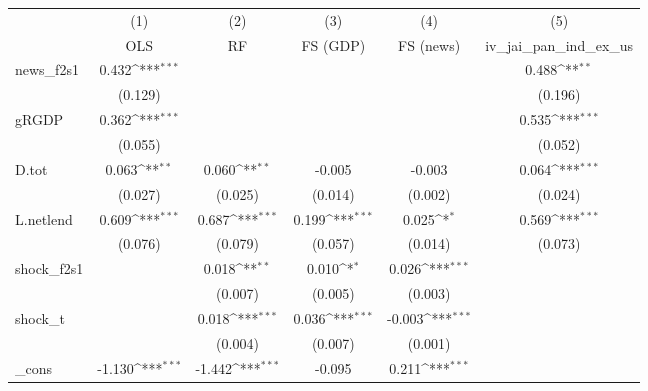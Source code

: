 {
\def\sym#1{\ifmmode^{#1}\else\(^{#1}\)\fi}
\begin{tabular}{l*{5}{c}}
\toprule
            &\multicolumn{1}{c}{(1)}&\multicolumn{1}{c}{(2)}&\multicolumn{1}{c}{(3)}&\multicolumn{1}{c}{(4)}&\multicolumn{1}{c}{(5)}\\
            &\multicolumn{1}{c}{OLS}&\multicolumn{1}{c}{RF}&\multicolumn{1}{c}{FS (GDP)}&\multicolumn{1}{c}{FS (news)}&\multicolumn{1}{c}{iv\_jai\_pan\_ind\_ex\_us}\\
\midrule
news\_f2s1   &       0.432\sym{***}&                     &                     &                     &       0.488\sym{**} \\
            &     (0.129)         &                     &                     &                     &     (0.196)         \\
\addlinespace
gRGDP       &       0.362\sym{***}&                     &                     &                     &       0.535\sym{***}\\
            &     (0.055)         &                     &                     &                     &     (0.052)         \\
\addlinespace
D.tot       &       0.063\sym{**} &       0.060\sym{**} &      -0.005         &      -0.003         &       0.064\sym{***}\\
            &     (0.027)         &     (0.025)         &     (0.014)         &     (0.002)         &     (0.024)         \\
\addlinespace
L.netlend   &       0.609\sym{***}&       0.687\sym{***}&       0.199\sym{***}&       0.025\sym{*}  &       0.569\sym{***}\\
            &     (0.076)         &     (0.079)         &     (0.057)         &     (0.014)         &     (0.073)         \\
\addlinespace
shock\_f2s1  &                     &       0.018\sym{**} &       0.010\sym{*}  &       0.026\sym{***}&                     \\
            &                     &     (0.007)         &     (0.005)         &     (0.003)         &                     \\
\addlinespace
shock\_t     &                     &       0.018\sym{***}&       0.036\sym{***}&      -0.003\sym{***}&                     \\
            &                     &     (0.004)         &     (0.007)         &     (0.001)         &                     \\
\addlinespace
\_cons      &      -1.130\sym{***}&      -1.442\sym{***}&      -0.095         &       0.211\sym{***}&                     \\

\end{tabular}}
